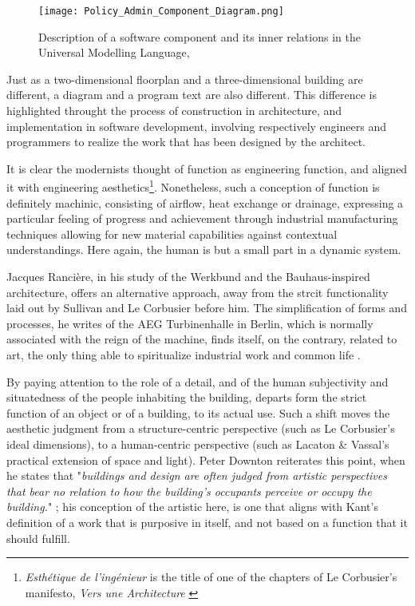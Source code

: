 \begin{figure}
    \texttt{[image: Policy\_Admin\_Component\_Diagram.png]}
    \caption{Description of a software component and its inner relations in the Universal Modelling Language, \citep{wikipedia_unified_2023}}
    \label{graphic:uml}
\end{figure}

Just as a two-dimensional floorplan and a three-dimensional building are different, a diagram and a program text are also different. This difference is highlighted throught the process of construction in architecture, and implementation in software development, involving respectively engineers and programmers to realize the work that has been designed by the architect.

It is clear the modernists thought of function as engineering function, and aligned it with engineering aesthetics\footnote{\emph{Esthétique de l'ingénieur} is the title of one of the chapters of Le Corbusier's manifesto, \emph{Vers une Architecture} \citep{lecorbusier_vers_1923}}. Nonetheless, such a conception of function is definitely machinic, consisting of airflow, heat exchange or drainage, expressing a particular feeling of progress and achievement through industrial manufacturing techniques allowing for new material capabilities against contextual understandings. Here again, the human is but a small part in a dynamic system.

Jacques Rancière, in his study of the Werkbund and the Bauhaus-inspired architecture, offers an alternative approach, away from the strcit functionality laid out by Sullivan and Le Corbusier before him. The simplification of forms and processes, he writes of the AEG Turbinenhalle in Berlin, which is normally associated with the reign of the machine, finds itself, on the contrary, related to art, the only thing able to spiritualize industrial work and common life \citep{ranciere_aisthesis_2013}.

By paying attention to the role of a detail, and of the human subjectivity and situatedness of the people inhabiting the building, departs form the strict function of an object or of a building, to its actual use. Such a shift moves the aesthetic judgment from a structure-centric perspective (such as Le Corbusier's ideal dimensions), to a human-centric perspective (such as Lacaton \& Vassal's practical extension of space and light). Peter Downton reiterates this point, when he states that "\emph{buildings and design are often judged from artistic perspectives that bear no relation to how the building’s occupants perceive or occupy the building.}" \citep{downton_knowledge_1998}; his conception of the artistic here, is one that aligns with Kant's definition of a work that is purposive in itself, and not based on a function that it should fulfill.

